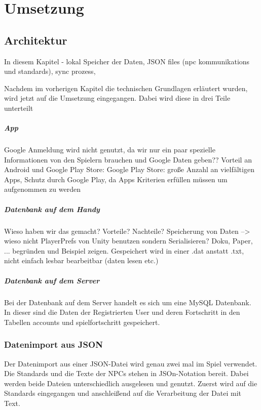 \chapter{Umsetzung}

\section{Architektur}

	In diesem Kapitel - lokal Speicher der Daten, JSON files (npc kommunikations und standards), sync prozess, 
	
	Nachdem im vorherigen Kapitel die technischen Grundlagen erläutert wurden, wird jetzt auf die Umsetzung eingegangen. Dabei wird diese in drei Teile unterteilt
	
	\paragraph{App}
		Google Anmeldung wird nicht genutzt, da wir nur ein paar spezielle Informationen von den Spielern brauchen und Google Daten geben??
		Vorteil an Android und Google Play Store: Google Play Store: große Anzahl an vielfältigen Apps, Schutz durch Google Play, da Apps Kriterien erfüllen müssen um aufgenommen zu werden
	
	\paragraph{Datenbank auf dem Handy}
		Wieso haben wir das gemacht? Vorteile? Nachteile?
		Speicherung von Daten --> wieso nicht PlayerPrefs von Unity benutzen sondern Serialisieren? Doku, Paper, ... begründen und Beispiel zeigen. Gespeichert wird in einer .dat anstatt .txt, nicht einfach lesbar bearbeitbar (daten lesen etc.)
		
	\paragraph{Datenbank auf dem Server}
		Bei der Datenbank auf dem Server handelt es sich um eine MySQL Datenbank. In dieser sind die Daten der Registrierten User und deren Fortschritt in den Tabellen accounts und spielfortschritt gespeichert.

	\subsection{Datenimport aus JSON}
		Der Datenimport aus einer JSON-Datei wird genau zwei mal im Spiel verwendet. Die Standards und die Texte der NPCs stehen in JSOn-Notation bereit. Dabei werden beide Dateien unterschiedlich ausgelesen und genutzt. Zuerst wird auf die Standards eingegangen und anschleißend auf die Verarbeitung der Datei mit Text. 
	
